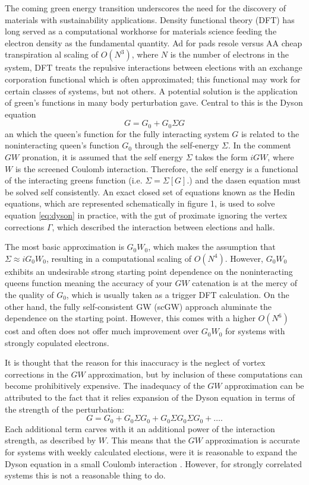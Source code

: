 
The coming green energy transition underscores the need for the discovery of materials with sustainability applications. Density functional theory (DFT) has long served as a computational workhorse for materials science feeding the electron density as the fundamental quantity. Ad for pads resole versus AA cheap transpiration al scaling of $O(N^3)$, where $N$ is the number of electrons in the system, DFT treats the repulsive interactions between elections with an exchange corporation functional which is often approximated; this functional may work for certain classes of systems, but not others. A potential solution is the application of green's functions in many body perturbation gave. Central to this is the Dyson equation
\begin{equation}
    G = G_0 + G_0 \Sigma G
\label{eq:dyson}
\end{equation}
an which the queen's function for the fully interacting system $G$ is related to the noninteracting queen's function $G_0$ through the self-energy $\Sigma$. In the comment $GW$ pronation, it is assumed that the self energy $\Sigma$ takes the form $iGW$, where $W$ is the screened Coulomb interaction. Therefore, the self energy is a functional of the interacting greens function (i.e. $\Sigma = \Sigma[G]$.) and the dasen equation must be solved self consistently. An exact closed set of equations known as the Hedin equations, which are represented schematically in figure 1, is used to solve equation \ref{eq:dyson} in practice, with the gut of proximate ignoring the vertex corrections $\Gamma $, which described the interaction between elections and halls.

The most basic approximation is \( G_0W_0 \), which makes the assumption that $\Sigma \approx i G_0 W_0$, resulting in a computational scaling of \( O(N^4) \). However, \( G_0W_0 \) exhibits an undesirable strong starting point dependence on the noninteracting queens function meaning the accuracy of your $GW$ catenation is at the mercy of the quality of $G_0$, which is usually taken as a trigger DFT calculation. On the other hand, the fully self-consistent GW (scGW) approach aluminate the dependence on the starting point. However, this comes with a higher $O(N^6)$ cost and often does not offer much improvement over \( G_0W_0 \) for systems with strongly copulated electrons.

It is thought that the reason for this inaccuracy is the neglect of vortex corrections in the $GW$ approximation, but by inclusion of these computations can become prohibitively expensive. The inadequacy of the $GW$ approximation can be attributed to the fact that it relies expansion of the Dyson equation in terms of the strength of the perturbation:
\begin{equation}
    G = G_0 + G_0 \Sigma G_0 + G_0 \Sigma G_0 \Sigma G_0 + \ldots.
\label{eq:dyson_expansion}
\end{equation}
Each additional term carves with it an additional power of the interaction strength, as described by $W$. This means that the $GW$ approximation is accurate for systems with weekly calculated elections, were it is reasonable to expand the Dyson equation in a small Coulomb interaction . However, for strongly correlated systems this is not a reasonable thing to do.


